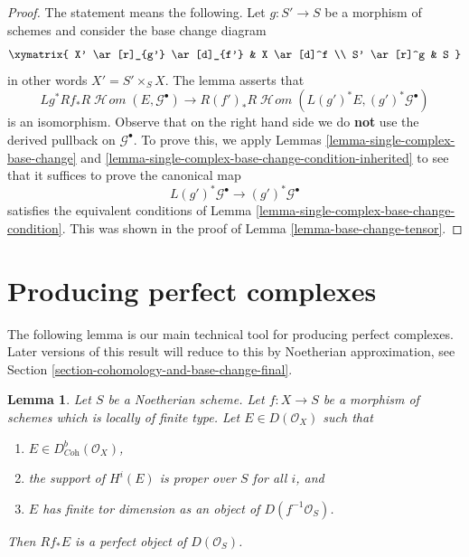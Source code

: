 \documentclass{stacks-project}
\theoremstyle{plain}
\newtheorem{lemma}[subsection]{Lemma}
\theoremstyle{definition}
\theoremstyle{remark}
\numberwithin{equation}{subsection}
\def\SheafHom{\mathop{\mathcal{H}\!\mathit{om}}\nolimits}
\begin{document}
\begin{proof}
The statement means the following. Let $g : S' \to S$ be a morphism of
schemes and consider the base change diagram
$$
\xymatrix{
X' \ar[r]_{g'} \ar[d]_{f'} &
X \ar[d]^f \\
S' \ar[r]^g &
S
}
$$
in other words $X' = S' \times_S X$. The lemma asserts that
$$
Lg^*Rf_*R\SheafHom(E, \mathcal{G}^\bullet)
\longrightarrow
R(f')_*R\SheafHom(L(g')^*E, (g')^*\mathcal{G}^\bullet)
$$
is an isomorphism. Observe that on the right hand side we do {\bf not}
use the derived pullback on $\mathcal{G}^\bullet$. To prove this, we apply
Lemmas \ref{lemma-single-complex-base-change} and
\ref{lemma-single-complex-base-change-condition-inherited} to see that it
suffices to prove the canonical map
$$
L(g')^*\mathcal{G}^\bullet \to (g')^*\mathcal{G}^\bullet
$$
satisfies the equivalent conditions of
Lemma \ref{lemma-single-complex-base-change-condition}.
This was shown in the proof of Lemma \ref{lemma-base-change-tensor}.
\end{proof}





\section{Producing perfect complexes}
\label{section-producing-perfect}

\noindent
The following lemma is our main technical tool for producing
perfect complexes. Later versions of this result will reduce to
this by Noetherian approximation, see
Section \ref{section-cohomology-and-base-change-final}.

\begin{lemma}
\label{lemma-perfect-direct-image}
Let $S$ be a Noetherian scheme. Let $f : X \to S$ be a morphism of schemes
which is locally of finite type. Let $E \in D(\mathcal{O}_X)$ such that
\begin{enumerate}
\item $E \in D^b_{\textit{Coh}}(\mathcal{O}_X)$,
\item the support of $H^i(E)$ is proper over $S$ for all $i$, and
\item $E$ has finite tor dimension as an object of $D(f^{-1}\mathcal{O}_S)$.
\end{enumerate}
Then $Rf_*E$ is a perfect object of $D(\mathcal{O}_S)$.
\end{lemma}
\end{document}
